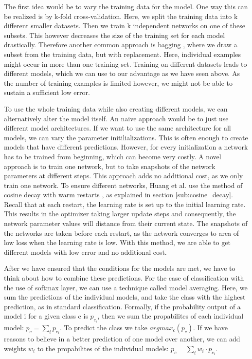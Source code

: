 The first idea would be to vary the training data for the model. One way this
can be realized is by k-fold cross-validation. Here, we split the training data
into k different smaller datasets. Then we train k independent networks on one
of these subsets. This however decreases the size of the training set for each
model drastically. Therefore another common approach is bagging
\cite{breiman1996bagging}, where we draw a subset from the training data, but
with replacement. Here, individual examples might occur in more than one
training set. Training on different datasets leads to different models, which we
can use to our advantage as we have seen above. As the number of training
examples is limited however, we might not be able to sustain a sufficient low
error.

To use the whole training data while also creating different models, we can
alternatively alter the model itself. An naive approach would be to just use
different model architectures. If we want to use the same architecture for all
models, we can vary the parameter initilializations. This is often enough to
create models that have different predictions. However, for every initialization
a network has to be trained from beginning, which can become very costly. A
novel approach is to train one network, but to take snapshots of the network
parameters at different steps. This approach adds no additional cost, as we only
train one network. To ensure different networks, Huang et al.
\cite{huang2017snapshot} use the method of cosine decay with warm restarts
\cite{loshchilov2016sgdr}, as explained in section \ref{sub:cosine_decay}.
Recall that at each restart, the learning rate is set up to the initial learning
rate. This results in the optimizer taking larger update steps and consequently,
the network parameter values will distance from their current state. The
snapshots of the networks are taken before each restart, as the network
converges to area of low loss when the learning rate is low. With this method,
we are able to get different models with low error and no additional cost.

After we have ensured that the conditions for the models are met, we have to
think about how to combine these predictions. For the case of classification
with the use of softmax layer, we can use a technique called model averaging.
Here, we sum the predictions of the individual models, and take the class with
the highest prediction, as in standard classification. Formally, if the
probability output of a model i for a given class c is $p_{c_i}$, then we sum
the propabilites of each individual model: $p_c = \sum_i p_{c_i}$. To predict
the class we take $argmax_c(p_c)$. If we have reasons to believe in a better
prediction of one model over another, we can add weights $w_i$ to the
propabilites of the individual models: $p_c = \sum_i w_i \cdot p_{c_i}$.


\begin{comment}
Further aspects that could be included:
- classififcation in general
- cross entropy loss and loss functions
- gradient descent


\end{comment}